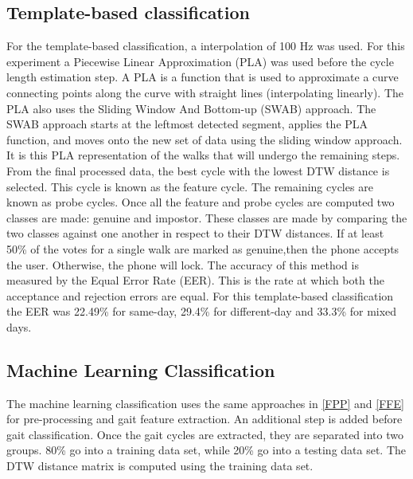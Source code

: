 \documentclass{sig-alternate}
\begin{document}
\subsection{Template-based classification}
	 For the template-based classification, a interpolation of 100 Hz was used. For this experiment a Piecewise Linear Approximation (PLA) was used before the cycle length estimation step. A PLA is a function that is used to approximate a curve connecting points along the curve with straight lines (interpolating linearly). The PLA also uses the Sliding Window And Bottom-up (SWAB) approach. The SWAB approach starts at the leftmost detected segment, applies the PLA function, and moves onto the new set of data using the sliding window approach. It is this PLA representation of the walks that will undergo the remaining steps. From the final processed data, the best cycle with the lowest DTW distance is selected. This cycle is known as the feature cycle. The remaining cycles are known as probe cycles. Once all the feature and probe cycles are computed two classes are made: genuine and impostor. These classes are made by comparing the two classes against one another in respect to their DTW distances. If at least 50\% of the votes for a single walk are marked as genuine,then the phone accepts the user. Otherwise, the phone will lock. The accuracy of this method is measured by the Equal Error Rate (EER). This is the rate at which both the acceptance and rejection errors are equal. For this template-based classification the EER was 22.49\% for same-day, 29.4\% for different-day and 33.3\% for mixed days.


\subsection{Machine Learning Classification}
	The machine learning classification uses the same approaches in \ref{FPP} and \ref{FFE} for pre-processing and gait feature extraction. An additional step is added before gait classification. Once the gait cycles are extracted, they are separated into two groups. 80\% go into a training data set, while 20\% go into a testing data set. The DTW distance matrix is computed using the training data set.
\end{document}
